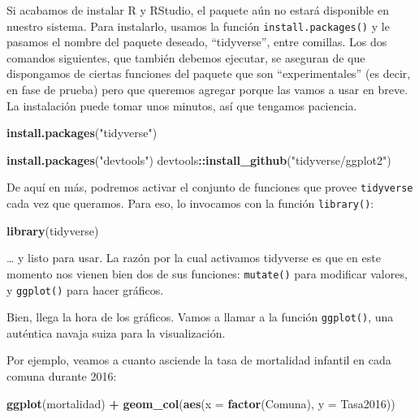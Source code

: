 \documentclass[]{book}
\newenvironment{Shaded}{\begin{snugshade}}{\end{snugshade}}
\newcommand{\KeywordTok}[1]{\textcolor[rgb]{0.13,0.29,0.53}{\textbf{#1}}}
\newcommand{\DataTypeTok}[1]{\textcolor[rgb]{0.13,0.29,0.53}{#1}}
\newcommand{\StringTok}[1]{\textcolor[rgb]{0.31,0.60,0.02}{#1}}
\newcommand{\OperatorTok}[1]{\textcolor[rgb]{0.81,0.36,0.00}{\textbf{#1}}}
\newcommand{\NormalTok}[1]{#1}
\begin{document}
Si acabamos de instalar R y RStudio, el paquete aún no estará disponible
en nuestro sistema. Para instalarlo, usamos la función
\texttt{install.packages()} y le pasamos el nombre del paquete deseado,
``tidyverse'', entre comillas. Los dos comandos siguientes, que también
debemos ejecutar, se aseguran de que dispongamos de ciertas funciones
del paquete que son ``experimentales'' (es decir, en fase de prueba)
pero que queremos agregar porque las vamos a usar en breve. La
instalación puede tomar unos minutos, así que tengamos paciencia.

\begin{Shaded}
\begin{Highlighting}[]
\KeywordTok{install.packages}\NormalTok{(}\StringTok{"tidyverse"}\NormalTok{)}

\KeywordTok{install.packages}\NormalTok{(}\StringTok{"devtools"}\NormalTok{)}
\NormalTok{devtools}\OperatorTok{::}\KeywordTok{install_github}\NormalTok{(}\StringTok{"tidyverse/ggplot2"}\NormalTok{)}
\end{Highlighting}
\end{Shaded}

De aquí en más, podremos activar el conjunto de funciones que provee
\texttt{tidyverse} cada vez que queramos. Para eso, lo invocamos con la
función \texttt{library()}:

\begin{Shaded}
\begin{Highlighting}[]
\KeywordTok{library}\NormalTok{(tidyverse)}
\end{Highlighting}
\end{Shaded}

\ldots{} y listo para usar. La razón por la cual activamos tidyverse es
que en este momento nos vienen bien dos de sus funciones:
\texttt{mutate()} para modificar valores, y \texttt{ggplot()} para hacer
gráficos.

Bien, llega la hora de los gráficos. Vamos a llamar a la función
\texttt{ggplot()}, una auténtica navaja suiza para la visualización.

Por ejemplo, veamos a cuanto asciende la tasa de mortalidad infantil en
cada comuna durante 2016:

\begin{Shaded}
\begin{Highlighting}[]
\KeywordTok{ggplot}\NormalTok{(mortalidad) }\OperatorTok{+}
\StringTok{    }\KeywordTok{geom_col}\NormalTok{(}\KeywordTok{aes}\NormalTok{(}\DataTypeTok{x =} \KeywordTok{factor}\NormalTok{(Comuna), }\DataTypeTok{y =}\NormalTok{ Tasa2016))}
\end{Highlighting}
\end{Shaded}
\end{document}
